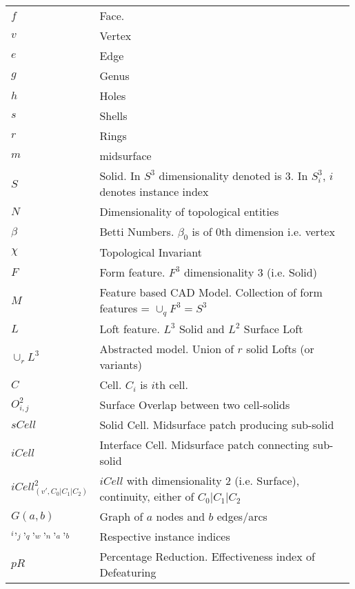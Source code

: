 \begin{table}[h!]

\begin{tabular}{p{0.18\linewidth} p{0.81\linewidth}}  %
  $f$ & Face.\\
  $v$ & Vertex \\
  $e$ & Edge \\
  $g$ & Genus\\
  $h$ & Holes \\
  $s$ & Shells \\
  $r$ & Rings \\
  $m$ & midsurface\\
  $S$ & Solid. In $S^3$ dimensionality denoted is $3$. In $S_i^3$, $i$ denotes instance index\\
  $N$ & Dimensionality of topological entities \\
  $\beta$ & Betti Numbers. $\beta_{0}$ is of $0$th dimension i.e. vertex \\
  $\chi$ & Topological Invariant \\
  $F$ & Form feature. $F^3$ dimensionality $3$ (i.e. Solid) \\ 
  $M$ & Feature based CAD Model. Collection of form features = $\cup_qF^3 = S^3$\\ 
  $L$ & Loft feature. $L^3$ Solid and $L^2$ Surface Loft\\
  $\cup_rL^3$ & Abstracted model. Union of $r$ solid Lofts (or variants) \\
  $C$ & Cell. $C_i$ is $i$th cell.\\
  $O_{i,j}^2$ & Surface Overlap between two cell-solids\\
  $sCell$ & Solid Cell. Midsurface patch producing sub-solid\\
  $iCell$ & Interface Cell. Midsurface patch connecting sub-solid\\
  $iCell^2_{(v',C_0|C_1 | C_2 )}$ & $iCell$ with dimensionality 2 (i.e. Surface), continuity, either of $C_0|C_1 | C_2 $\\
  $G(a,b)$ & Graph of $a$ nodes and $b$ edges/arcs\\
  $_i,_j,_q,_w,_n,_a,_b$ & Respective instance indices\\
  $pR$ & Percentage Reduction. Effectiveness index of Defeaturing\\
\end{tabular}

 \end{table}